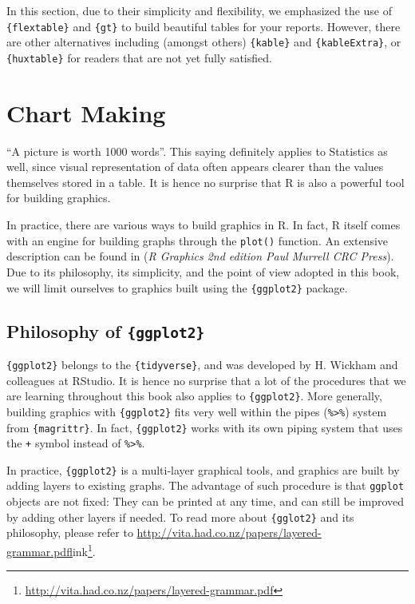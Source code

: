 \documentclass[
]{krantz}
\renewcommand{\href}[2]{#2\footnote{\url{#1}}}
\begin{document}
In this section, due to their simplicity and flexibility, we emphasized the use of \texttt{\{flextable\}} and \texttt{\{gt\}} to build beautiful tables for your reports. However, there are other alternatives including (amongst others) \texttt{\{kable\}} and \texttt{\{kableExtra\}}, or \texttt{\{huxtable\}} for readers that are not yet fully satisfied.

\hypertarget{chart-making}{%
\section{Chart Making}\label{chart-making}}

``A picture is worth 1000 words''. This saying definitely applies to Statistics as well, since visual representation of data often appears clearer than the values themselves stored in a table. It is hence no surprise that R is also a powerful tool for building graphics.

In practice, there are various ways to build graphics in R. In fact, R itself comes with an engine for building graphs through the \texttt{plot()} function. An extensive description can be found in (\emph{R Graphics 2nd edition Paul Murrell CRC Press}). Due to its philosophy, its simplicity, and the point of view adopted in this book, we will limit ourselves to graphics built using the \texttt{\{ggplot2\}} package.

\hypertarget{philosophy-of-ggplot2}{%
\subsection{\texorpdfstring{Philosophy of \texttt{\{ggplot2\}}}{Philosophy of \{ggplot2\}}}\label{philosophy-of-ggplot2}}

\texttt{\{ggplot2\}} belongs to the \texttt{\{tidyverse\}}, and was developed by H. Wickham and colleagues at RStudio. It is hence no surprise that a lot of the procedures that we are learning throughout this book also applies to \texttt{\{ggplot2\}}. More generally, building graphics with \texttt{\{ggplot2\}} fits very well within the pipes (\texttt{\%\textgreater{}\%}) system from \texttt{\{magrittr\}}. In fact, \texttt{\{ggplot2\}} works with its own piping system that uses the \texttt{+} symbol instead of \texttt{\%\textgreater{}\%}.

In practice, \texttt{\{ggplot2\}} is a multi-layer graphical tools, and graphics are built by adding layers to existing graphs. The advantage of such procedure is that \texttt{ggplot} objects are not fixed: They can be printed at any time, and can still be improved by adding other layers if needed. To read more about \texttt{\{gglot2\}} and its philosophy, please refer to \url{http://vita.had.co.nz/papers/layered-grammar.pdf}\href{http://vita.had.co.nz/papers/layered-grammar.pdf}{link}.
\end{document}
